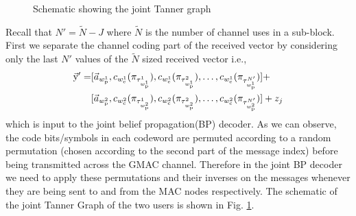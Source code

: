 \begin{figure}[h!]
  \centering
  \resizebox{0.5\textwidth}{!}{}
  \caption{Schematic showing the joint Tanner graph}
  \label{fig:decodergraph}
\end{figure}

Recall that $N'=\tilde{N}-J$ where $\tilde{N}$ is the number of channel uses in a sub-block. First we separate the channel coding part of the received vector by considering only the last $N'$ values of the $\tilde{N}$ sized received vector i.e.,
\begin{align*}
\vec{\mathrm{y}}'= &[\vec{a}_{w^1_\mathrm{p}},c_{w^1_\mathrm{c}}(\pi_{\tau_{w^1_\mathrm{p}}^1}),c_{w^1_\mathrm{c}}(\pi_{\tau_{w^1_\mathrm{p}}^2}),\ldots,c_{w^1_\mathrm{c}}(\pi_{\tau_{w^1_\mathrm{p}}^{N'}})]+\\
&[\vec{a}_{w^2_\mathrm{p}},c_{w^2_\mathrm{c}}(\pi_{\tau_{w^2_\mathrm{p}}^1}),c_{w^2_\mathrm{c}}(\pi_{\tau_{w^2_\mathrm{p}}^2}),\ldots,c_{w^2_\mathrm{c}}(\pi_{\tau_{w^2_\mathrm{p}}^{N'}})]+z_j
\end{align*}
which is input to the joint belief propagation(BP) decoder. As we can observe, the code bits/symbols in each codeword are permuted according to a random permutation (chosen according to the second part of the message index) before being transmitted across the GMAC channel. Therefore in the joint BP decoder we need to apply these permutations and their inverses on the messages whenever they are being sent to and from the MAC nodes respectively. The schematic of the joint Tanner Graph of the two users is shown in Fig. \ref{fig:decodergraph}.\\


